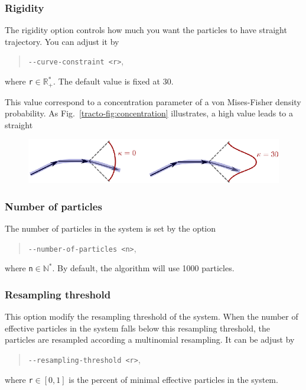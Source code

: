     \subsubsection*{Rigidity}
        The rigidity option controls how much you want the particles to have straight trajectory. You can adjust it by
            \begin{quote}
                \texttt{-\hspace{0.1mm}-curve-constraint <r>},
            \end{quote}
        where \texttt{r}$\in\mathbb{R}_+^*$. The default value is fixed at 30.

        This value correspond to a concentration parameter of a von Mises-Fisher density probability. As Fig.~\ref{tracto-fig:concentration} illustrates, a high value leads to a straight

        \begin{figure}
            \centering
            \includegraphics[height=0.1\textheight]{concentration}
            \caption{}
        \end{figure}


    \subsubsection*{Number of particles}
        The number of particles in the system is set by the option
            \begin{quote}
                \texttt{-\hspace{0.1mm}-number-of-particles <n>},
            \end{quote}
        where \texttt{n}$\in\mathbb{N}^*$. By default, the algorithm will use 1000 particles.


    \subsubsection*{Resampling threshold}
        This option modify the resampling threshold of the system. When the number of effective particles in the system falls below this resampling threshold, the particles are resampled according a multinomial resampling. It can be adjust by
            \begin{quote}
                \texttt{-\hspace{0.1mm}-resampling-threshold <r>},
            \end{quote}
        where \texttt{r}$\in[0,1]$ is the percent of minimal effective particles in the system.
